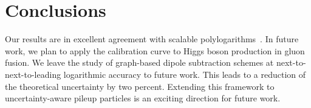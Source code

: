 \section{Conclusions}\label{sec:conclusions}

Our results are in excellent agreement with scalable
polylogarithms~\cite{TPC:2388-A-Zero-Shot-Approach-to-Quark-Gluon-Discrimination-September-23-2026}.
In future work, we plan to apply the calibration curve to Higgs boson
production in gluon fusion. We leave the study of graph-based dipole
subtraction schemes at next-to-next-to-leading logarithmic accuracy to
future work. This leads to a reduction of the theoretical uncertainty by
two percent. Extending this framework to uncertainty-aware pileup
particles is an exciting direction for future work.

